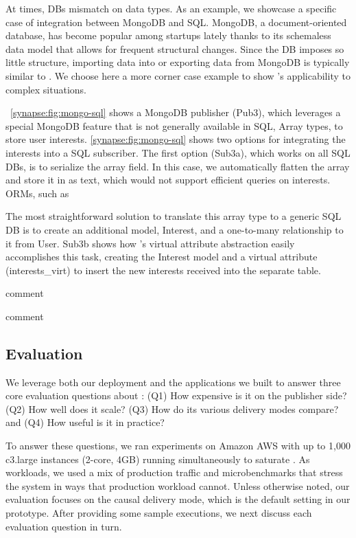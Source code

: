 At times, DBs mismatch on data types.  As an example, we showcase a specific
case of integration between MongoDB and SQL.
MongoDB, a document-oriented database, has become popular among startups
lately thanks to its schemaless data model that allows for frequent
structural changes.  Since the DB imposes so little structure, importing data
into or exporting data from MongoDB is typically similar to
\label{synapse:fig:mongo-to-star}. We choose here a more corner case example to
show \synapse's applicability to complex situations.

\F~\ref{synapse:fig:mongo-sql} shows a MongoDB publisher (Pub3), which leverages a
special MongoDB feature that is not generally available in SQL,
Array types, to store user interests.  \F\ref{synapse:fig:mongo-sql} shows two options
for integrating the interests into a SQL subscriber.  The first option (Sub3a),
which works on all SQL DBs, is to serialize the array field.
In this case, we automatically flatten the array and store it in as text, which would not support efficient queries on interests.  ORMs, such as

The most straightforward solution to translate this array type to a generic SQL DB is to create an additional model, {\code \footnotesize Interest}, and a one-to-many relationship to it from {\code \footnotesize User}.
Sub3b shows how \synapse's virtual attribute abstraction easily accomplishes
this task, creating the {\code \footnotesize Interest} model and a virtual
attribute  ({\code \footnotesize interests\_virt}) to insert the new interests
received into the separate table.

   comment

   comment

\subsection{Evaluation}
\label{synapse:sec:evaluation}

We leverage both our deployment and the applications we built to answer three
core evaluation questions about \synapse: (Q1) How expensive is it
on the publisher side? (Q2) How well does it scale? (Q3) How do its various
delivery modes compare? and (Q4) How useful is it in practice?

To answer these questions, we ran experiments on Amazon AWS with up to 1,000
c3.large instances (2-core, 4GB) running simultaneously to saturate \synapse.
As workloads, we used a mix of \crowdtap production traffic and microbenchmarks
that stress the system in ways that production workload cannot.  Unless
otherwise noted, our evaluation focuses on the causal delivery mode, which is
the default setting in our prototype.  After providing some sample executions,
we next discuss each evaluation question in turn.

